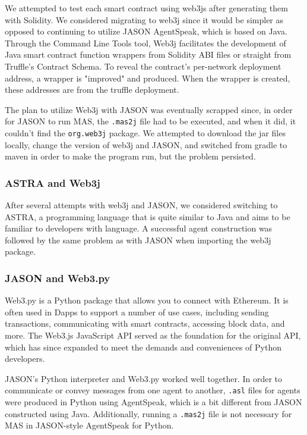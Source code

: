 We attempted to test each smart contract using web3js after generating them with Solidity. We considered migrating to web3j since it would be simpler as opposed to continuing to utilize JASON AgentSpeak, which is based on Java. Through the Command Line Tools tool, Web3j facilitates the development of Java smart contract function wrappers from Solidity ABI files or straight from Truffle's Contract Schema. To reveal the contract's per-network deployment address, a wrapper is "improved" and produced. When the wrapper is created, these addresses are from the truffle deployment.

\vspace{.5cm}

The plan to utilize Web3j with JASON was eventually scrapped since, in order for JASON to run \ac{MAS}, the \texttt{.mas2j} file had to be executed, and when it did, it couldn't find the \texttt{org.web3j} package. We attempted to download the jar files locally, change the version of web3j and JASON, and switched from gradle to maven in order to make the program run, but the problem persisted.

\subsubsection{ASTRA and Web3j}

After several attempts with web3j and JASON, we considered switching to \ac{ASTRA}, a programming language that is quite similar to Java and aims to be familiar to developers with language. A successful agent construction was followed by the same problem as with JASON when importing the web3j package.

\subsubsection{JASON and Web3.py}

Web3.py is a Python package that allows you to connect with Ethereum. It is often used in \ac{Dapp}s to support a number of use cases, including sending transactions, communicating with smart contracts, accessing block data, and more. The Web3.js JavaScript \ac{API} served as the foundation for the original \ac{API}, which has since expanded to meet the demands and conveniences of Python developers.

\vspace{.5cm}

JASON's Python interpreter and Web3.py worked well together. In order to communicate or convey messages from one agent to another, \texttt{.asl} files for agents were produced in Python using AgentSpeak, which is a bit different from JASON constructed using Java. Additionally, running a \texttt{.mas2j} file is not necessary for \ac{MAS} in JASON-style AgentSpeak for Python.

